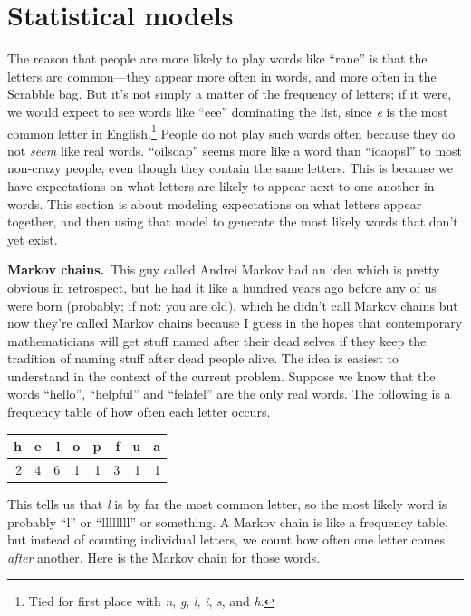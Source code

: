 \documentclass[twocolumn]{article}
\begin{document}
\section{Statistical models}

The reason that people are more likely to play words like ``rane'' is
that the letters are common---they appear more often in words, and
more often in the Scrabble bag. But it's not simply a matter of the
frequency of letters; if it were, we would expect to see words like
``eee'' dominating the list, since {\it e} is the most common letter
in English.\!\footnote{Tied for first place with {\it n}, {\it g},
{\it l}, {\it i}, {\it s}, and {\it h}.} People do not play such words
often because they do not {\it seem} like real words. ``oilsoap''
seems more like a word than ``ioaopsl'' to most non-crazy people,
even though they contain the same letters. This is because we have
expectations on what letters are likely to appear next to one
another in words. This section is about modeling expectations on
what letters appear together, and then using that model to generate
the most likely words that don't yet exist.

{\bf Markov chains.}\,
This guy called Andrei Markov had an idea which is pretty obvious in
retrospect, but he had it like a hundred years ago before any of us
were born (probably; if not: you are old), which he didn't call Markov
chains but now they're called Markov chains because I guess in the
hopes that contemporary mathematicians will get stuff named after
their dead selves if they keep the tradition of naming stuff after
dead people alive. The idea is easiest to understand in the context
of the current problem. Suppose we know that the words ``hello'',
``helpful'' and ``felafel'' are the only real words. The following
is a frequency table of how often each letter occurs.

\begin{center}
\begin{tabular}{|r|r|r|r|r|r|r|r|} %
\hline
h   & e   & l   & o   & p   & f   & u   & a    \\
\hline
2   & 4   & 6   & 1   & 1   & 3   & 1   & 1    \\
\hline
\end{tabular}
\end{center}

This tells us that {\it l} is by far the most common letter, so the
most likely word is probably ``l'' or ``llllllll'' or something. A
Markov chain is like a frequency table, but instead of counting
individual letters, we count how often one letter comes {\it after}
another. Here is the Markov chain for those words.
\end{document}
